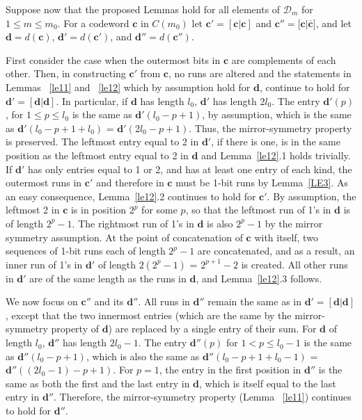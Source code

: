 Suppose now that the proposed Lemmas hold for all elements of
$\mathcal{D}_{m}$ for $1 \le m \le m_0$. For a codeword
$\mathbf{c}$ in $C(m_0)$ let $\mathbf{c'} = [\mathbf{c} |
\mathbf{c}]$ and $\mathbf{c''} = [\mathbf{c} |$$
\overline{\mathbf{c}}]$, and let $\mathbf{d}=d(\mathbf{c})$,
$\mathbf{d'}=d(\mathbf{c'})$, and $\mathbf{d''}=d(\mathbf{c''})$.

First consider the case when the outermost bits in $\mathbf{c}$
are complements of each other. Then, in constructing $\mathbf{c'}$
from $\mathbf{c}$, no runs are altered and the statements in
Lemmas ~\ref{le11} and ~\ref{le12} which by assumption hold for
$\mathbf{d}$, continue to hold for $\mathbf{d'}=[\mathbf{d}|
\mathbf{d}]$. In particular, if $\mathbf{d}$ has length $l_0$,
$\mathbf{d'}$ has length $2l_0$. The entry $\mathbf{d'}(p)$, for
$1\leq p \leq l_0$ is the same as $\mathbf{d'}(l_0-p+1)$, by
assumption, which is the same as $\mathbf{d'}(l_0-p+1+l_0)$ =
$\mathbf{d'}(2l_0-p+1)$. Thus, the mirror-symmetry property is
preserved. The leftmost entry equal to 2 in $\mathbf{d'}$, if
there is one, is in the same position as the leftmost entry equal
to 2 in $\mathbf{d}$ and Lemma~\ref{le12}.1 holds trivially. If
$\mathbf{d'}$ has only entries equal to 1 or 2, and has at least
one entry of each kind, the outermost runs in $\mathbf{c'}$ and
therefore in $\mathbf{c}$ must be 1-bit runs by Lemma~\ref{LE3}.
As an easy consequence, Lemma~\ref{le12}.2 continues to hold for
$\mathbf{c'}$. By assumption, the leftmost 2 in $\mathbf{c}$ is in
position $2^p$ for some $p$, so that the leftmost run of 1's in
$\mathbf{d}$ is of length $2^p-1$. The rightmost run of 1's in
$\mathbf{d}$ is also $2^p-1$ by the mirror symmetry assumption. At
the point of concatenation of $\mathbf{c}$ with itself, two
sequences of 1-bit runs each of length $2^p-1$ are concatenated,
and as a result, an inner run of 1's in $\mathbf{d'}$ of length
$2(2^p-1)$ = $2^{p+1}-2$ is created. All other runs in
$\mathbf{d'}$ are of the same length as the runs in $\mathbf{d}$,
and Lemma~\ref{le12}.3 follows.

We now focus on $\mathbf{c''}$ and its $\mathbf{d''}$. All runs in
$\mathbf{d''}$ remain the same as in
$\mathbf{d'}=[\mathbf{d}|\mathbf{d}]$, except that the two
innermost entries (which are the same by the mirror-symmetry
property of $\mathbf{d}$) are replaced by a single entry of their
sum. For $\mathbf{d}$ of length $l_0$, $\mathbf{d''}$ has length
$2l_0-1$. The entry $\mathbf{d''}(p)$ for $1 < p \leq l_0-1$ is
the same as $\mathbf{d''}(l_0-p+1)$, which is also the same as
$\mathbf{d''}(l_0-p+1+l_0-1)$ = $\mathbf{d''}((2l_0-1)-p+1)$. For
$p=1$, the entry in the first position in $\mathbf{d''}$ is the
same as both the first and the last entry in $\mathbf{d}$, which
is itself equal to the last entry in $\mathbf{d''}$. Therefore,
the mirror-symmetry property (Lemma ~\ref{le11}) continues to hold
for $\mathbf{d''}$.

